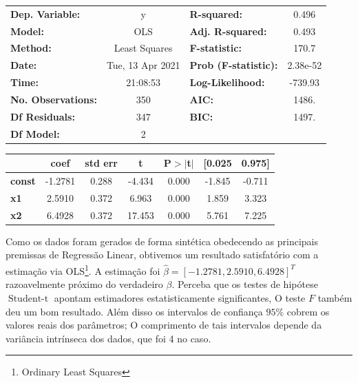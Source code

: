 \documentclass[12pt,letterpaper]{article}
\newcommand{\op}{\operatorname}
\begin{document}
\begin{center}
	\begin{tabular}{lclc}
		\toprule
		\textbf{Dep. Variable:}    &        y         & \textbf{  R-squared:         } &     0.496   \\
		\textbf{Model:}            &       OLS        & \textbf{  Adj. R-squared:    } &     0.493   \\
		\textbf{Method:}           &  Least Squares   & \textbf{  F-statistic:       } &     170.7   \\
		\textbf{Date:}             & Tue, 13 Apr 2021 & \textbf{  Prob (F-statistic):} &  2.38e-52   \\
		\textbf{Time:}             &     21:08:53     & \textbf{  Log-Likelihood:    } &   -739.93   \\
		\textbf{No. Observations:} &         350      & \textbf{  AIC:               } &     1486.   \\
		\textbf{Df Residuals:}     &         347      & \textbf{  BIC:               } &     1497.   \\
		\textbf{Df Model:}         &           2      & \textbf{                     } &             \\
		\bottomrule
	\end{tabular}
	\begin{tabular}{lcccccc}
		& \textbf{coef} & \textbf{std err} & \textbf{t} & \textbf{P$> |$t$|$} & \textbf{[0.025} & \textbf{0.975]}  \\
		\midrule
		\textbf{const} &      -1.2781  &        0.288     &    -4.434  &         0.000        &       -1.845    &       -0.711     \\
		\textbf{x1}    &       2.5910  &        0.372     &     6.963  &         0.000        &        1.859    &        3.323     \\
		\textbf{x2}    &       6.4928  &        0.372     &    17.453  &         0.000        &        5.761    &        7.225     \\
		\bottomrule
	\end{tabular}
\end{center}

	Como os dados foram gerados de forma sintética obedecendo as principais premissas de Regressão Linear, obtivemos um resultado satisfatório com a estimação via OLS\footnote{Ordinary Least Squares}. A estimação foi $\hat\beta = [-1.2781,2.5910,6.4928]^T$ razoavelmente próximo do verdadeiro $\beta$. Perceba que os testes de hipótese $\op{Student-t}$ apontam estimadores estatisticamente significantes, O teste $F$ também deu um bom resultado. Além disso os intervalos de confiança $95\%$ cobrem os valores reais dos parâmetros; O comprimento de tais intervalos depende da variância intrínseca dos dados, que foi 4 no caso.
	
\end{document}
